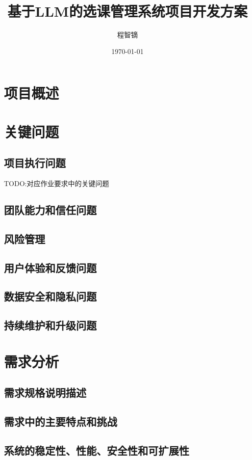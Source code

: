 \documentclass{article}
\title{基于LLM的选课管理系统项目开发方案}
\author{程智镝}
\date{\today}
\begin{document}
\maketitle

\tableofcontents

\newpage

\section{项目概述}

\section{关键问题}
\subsection{项目执行问题}
TODO:对应作业要求中的关键问题
\subsection{团队能力和信任问题}
\subsection{风险管理}
\subsection{用户体验和反馈问题}
\subsection{数据安全和隐私问题}
\subsection{持续维护和升级问题}

\section{需求分析}
\subsection{需求规格说明描述}
\subsection{需求中的主要特点和挑战}
\subsection{系统的稳定性、性能、安全性和可扩展性}
\end{document}
